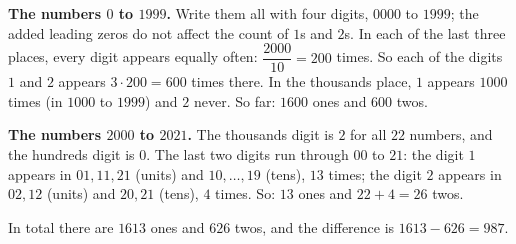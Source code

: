 \textbf{The numbers $0$ to $1999$.} Write them all with four digits, $0000$ to $1999$; the added leading zeros do not affect the count of $1$s and $2$s. In each of the last three places, every digit appears equally often: $\dfrac{2000}{10}=200$ times. So each of the digits $1$ and $2$ appears $3\cdot200=600$ times there. In the thousands place, $1$ appears $1000$ times (in $1000$ to $1999$) and $2$ never. So far: $1600$ ones and $600$ twos.

\textbf{The numbers $2000$ to $2021$.} The thousands digit is $2$ for all $22$ numbers, and the hundreds digit is $0$. The last two digits run through $00$ to $21$: the digit $1$ appears in $01,11,21$ (units) and $10,\dots,19$ (tens), $13$ times; the digit $2$ appears in $02,12$ (units) and $20,21$ (tens), $4$ times. So: $13$ ones and $22+4=26$ twos.

In total there are $1613$ ones and $626$ twos, and the difference is $1613-626=\boxed{987}$.
